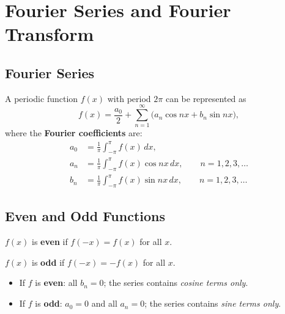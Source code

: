 \chapter{Fourier Series and Fourier Transform}

\section{Fourier Series}

\begin{definition}
A periodic function $f(x)$ with period $2\pi$ can be represented as
\[
  f(x) = \frac{a_0}{2} + \sum_{n=1}^{\infty}\bigl(a_n\cos nx + b_n\sin nx\bigr),
\]
where the \textbf{Fourier coefficients} are:
\begin{align*}
  a_0 &= \frac{1}{\pi}\int_{-\pi}^{\pi} f(x)\,dx, \\[6pt]
  a_n &= \frac{1}{\pi}\int_{-\pi}^{\pi} f(x)\cos nx\,dx, \qquad n = 1,2,3,\ldots \\[6pt]
  b_n &= \frac{1}{\pi}\int_{-\pi}^{\pi} f(x)\sin nx\,dx, \qquad n = 1,2,3,\ldots
\end{align*}
\end{definition}

\section{Even and Odd Functions}

\begin{definition}
$f(x)$ is \textbf{even} if $f(-x) = f(x)$ for all $x$.
\end{definition}

\begin{definition}
$f(x)$ is \textbf{odd} if $f(-x) = -f(x)$ for all $x$.
\end{definition}

\begin{theorem}
\begin{itemize}
  \item If $f$ is \textbf{even}: all $b_n = 0$; the series contains \emph{cosine terms only}.
  \item If $f$ is \textbf{odd}: $a_0 = 0$ and all $a_n = 0$; the series contains
        \emph{sine terms only}.
\end{itemize}
\end{theorem}

